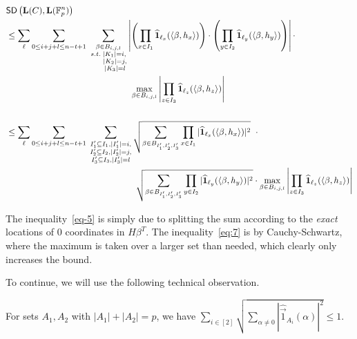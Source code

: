 {\allowdisplaybreaks
\begin{align}
&\SD{\vec{L}(C)}{\vec{L}(\F^n_p)} \nonumber\\
&\leq \sum_{\vec{\ell}} \sum_{0\leq i+j+l\leq n-t+1} \; \sum_{ \substack{\beta\in B_{i,j,l} \\ s.t.\; |K_1|=i,\\ \indent |K_2|=j,\\ \indent |K_3|=l}} \left| \left( \prod_{x\in I_1}\widehat{\mathbf{1}}_{\ell_x}(\ip{\beta,h_x}) \right) \cdot \left( \prod_{y\in I_2}\widehat{\mathbf{1}}_{\ell_y}(\ip{\beta,h_y}) \right)	\right| \cdot \label{eq-5} \\
&\hphantom{{}=\leq \sum_{\vec{\ell}} \sum_{0\leq i+j+l\leq n-t+1} \sum_{	\substack{\beta\in B_{i,j,l} s.t.\\ |K_1|=i,\\ |K_2|=j,\\|K_3|=l}}}\max_{\beta\in B_{i,j,l}} \left| \prod_{z\in I_3} \widehat{\mathbf{1}}_{\ell_z}(\ip{\beta,h_z}) \right| \nonumber \\ &\nonumber \\
&\leq \sum_{\vec{\ell}} \sum_{0\leq i+j+l\leq n-t+1} \; \sum_{\substack{I'_1\subseteq I_1,|I'_1|=i, \\I'_2\subseteq I_2,|I'_2|=j, \\I'_3\subseteq I_3,|I'_3|=l}} \sqrt{\sum_{\substack{\beta\in B_{I'_1,I'_2,I'_3}}} \prod_{x\in I_1}|\widehat{\mathbf{1}}_{\ell_x}(\ip{\beta,h_x})|^2}\;\;\cdot \label{eq:7} \\
&\hphantom{{}=\leq \sum_{\vec{\ell}} \sum_{0\leq i+j+l\leq n-t+1} \sum_{\substack{I'_1\subseteq I_1,|I'_1|=i,\\I'_2\subseteq I_2,|I'_2|=j,\\I'_3\subseteq I_3,|I'_3|=l}}} \sqrt{\sum_{\substack{\beta\in B_{I'_1,I'_2,I'_3}}} \prod_{y\in I_2}|\widehat{\mathbf{1}}_{\ell_y}(\ip{\beta,h_y})|^2} \cdot\max_{\beta\in B_{i,j,l}}\left|\prod_{z\in I_3}\widehat{\mathbf{1}}_{\ell_z}(\ip{\beta,h_z})\right| \nonumber
\end{align}}

The inequality~\ref{eq-5} is simply due to splitting the sum according to the \emph{exact} locations of $0$ coordinates in $H\beta^T$.
The inequality~\ref{eq:7} is by Cauchy-Schwartz, where the maximum is taken over a larger set than needed, which clearly only increases the bound.

To continue, we will use the following technical observation.

\begin{observation}
\label{clm:tech}
For sets $A_1,A_2$ with $|A_1|+|A_2|=p$, we have $\sum\limits_{i\in[2]}\sqrt{\sum\limits_{\alpha\neq 0}|\widehat{\vec{1}}_{A_i}(\alpha)|^2}\leq 1$.
\end{observation}

